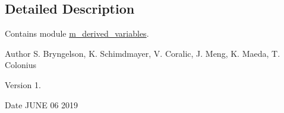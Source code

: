 \subsection{Detailed Description}
Contains module \hyperlink{namespacem__derived__variables}{m\+\_\+derived\+\_\+variables}. 

\begin{DoxyAuthor}{Author}
S. Bryngelson, K. Schimdmayer, V. Coralic, J. Meng, K. Maeda, T. Colonius 
\end{DoxyAuthor}
\begin{DoxyVersion}{Version}
1. 
\end{DoxyVersion}
\begin{DoxyDate}{Date}
J\+U\+NE 06 2019 
\end{DoxyDate}
